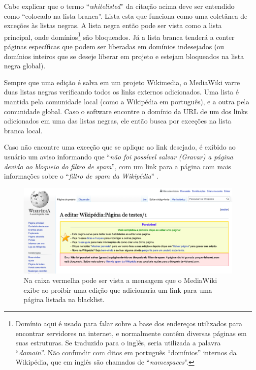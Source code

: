 Cabe explicar que o termo ``\textit{whitelisted}'' da citação acima deve ser entendido como ``colocado na lista branca''. Lista esta que funciona como uma coletânea de exceções às listas negras. A lista negra então pode ser vista como a lista principal, onde domínios\footnote{Domínio aqui é usado para falar sobre a base dos endereços utilizados para encontrar servidores na internet, e normalmente contêm diversas páginas em suas estruturas. Se traduzido para o inglês, seria utilizada a palavra ``\textit{domain}''. Não confundir com ditos em português ``domínios'' internos da Wikipédia, que em inglês são chamados de ``\textit{namespaces}''.} são bloqueados. Já a lista branca tenderá a conter páginas específicas que podem ser liberadas em domínios indesejados (ou domínios inteiros que se deseje liberar em projeto e estejam bloqueados na lista negra global).

Sempre que uma edição é salva em um projeto Wikimedia, o MediaWiki varre duas listas negras verificando todos os links externos adicionados. Uma lista é mantida pela comunidade local (como a Wikipédia em português), e a outra pela comunidade global. Caso o software encontre o domínio da URL de um dos links adicionados em uma das listas negras, ele então busca por exceções na lista branca local.

Caso não encontre uma exceção que se aplique ao link desejado, é exibido ao usuário um aviso informando que ``\textit{não foi possível salvar (Gravar) a página devido ao bloqueio do filtro de spam}'', com um link para a página com mais informações sobre o ``\textit{filtro de spam da Wikipédia}'' .

\begin{figure}[H]
    \centering
    \includegraphics[width=1\textwidth]{Images/mediawiki_blacklist.png}
    \caption{Na caixa vermelha pode ser vista a mensagem que o MediaWiki exibe ao proibir uma edição que adicionaria um link para uma página listada na blacklist.}
    \label{fig:mediawiki_blacklist}
\end{figure}

